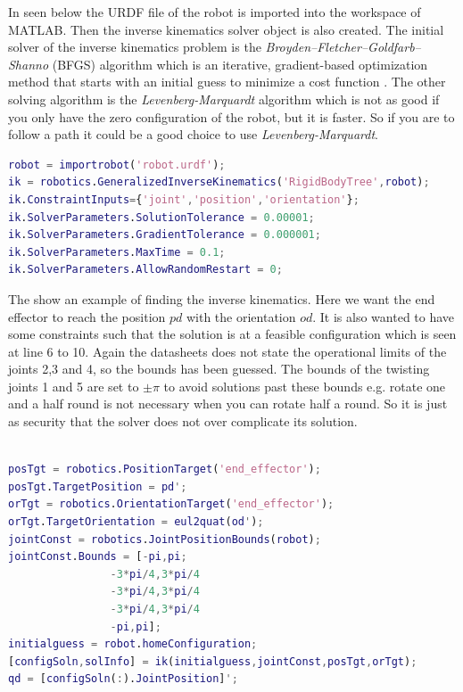 In  seen below the URDF file of the robot is imported into the workspace of MATLAB. Then the inverse kinematics solver object is also created. The initial solver of the inverse kinematics problem is the \textit{Broyden–Fletcher–Goldfarb–Shanno} (BFGS) algorithm which is an iterative, gradient-based optimization method that starts with an initial guess to minimize a cost function \cite{MatlabRobTool}. The other solving algorithm is the \textit{Levenberg-Marquardt} algorithm which is not as good if you only have the zero configuration of the robot, but it is faster. So if you are to follow a path it could be a good choice to use \textit{Levenberg-Marquardt}. 
\begin{lstlisting}[caption={MATLAB code of creating a invrerse kinematics},label={lst:robotinit},language=Matlab]
robot = importrobot('robot.urdf');
ik = robotics.GeneralizedInverseKinematics('RigidBodyTree',robot);
ik.ConstraintInputs={'joint','position','orientation'};
ik.SolverParameters.SolutionTolerance = 0.00001;
ik.SolverParameters.GradientTolerance = 0.000001;
ik.SolverParameters.MaxTime = 0.1;
ik.SolverParameters.AllowRandomRestart = 0;
\end{lstlisting}
The  show an example of finding the inverse kinematics. Here we want the end effector to reach the position $pd$ with the orientation $od$. It is also wanted to have some constraints such that the solution is at a feasible configuration which is seen at line 6 to 10. Again the datasheets does not state the operational limits of the joints 2,3 and 4, so the bounds has been guessed. The bounds of the twisting joints 1 and 5 are set to $\pm \pi$ to avoid solutions past these bounds e.g. rotate one and a half round is not necessary when you can rotate half a round. So it is just as security that the solver does not over complicate its solution. \\\\
\begin{lstlisting}[caption={MATLAB code of creating a inverse kinematics},label={lst:gik},language=Matlab]
posTgt = robotics.PositionTarget('end_effector');
posTgt.TargetPosition = pd';
orTgt = robotics.OrientationTarget('end_effector');
orTgt.TargetOrientation = eul2quat(od');
jointConst = robotics.JointPositionBounds(robot);
jointConst.Bounds = [-pi,pi;
                -3*pi/4,3*pi/4
                -3*pi/4,3*pi/4
                -3*pi/4,3*pi/4
                -pi,pi];
initialguess = robot.homeConfiguration;
[configSoln,solInfo] = ik(initialguess,jointConst,posTgt,orTgt);
qd = [configSoln(:).JointPosition]';
\end{lstlisting}
